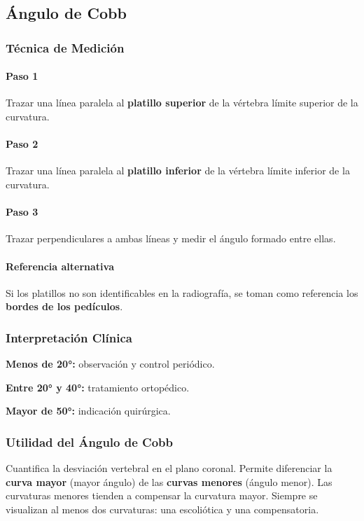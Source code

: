 	\twocolumn	
	\clearpage
	\subsection{Ángulo de Cobb}
	
	\subsubsection*{Técnica de Medición}
	
	\paragraph{Paso 1}
	Trazar una línea paralela al \textbf{platillo superior} de la vértebra límite superior de la curvatura.
	
	\paragraph{Paso 2}
	Trazar una línea paralela al \textbf{platillo inferior} de la vértebra límite inferior de la curvatura.
	
	\paragraph{Paso 3}
	Trazar perpendiculares a ambas líneas y medir el ángulo formado entre ellas.
	
	\paragraph{Referencia alternativa}
	Si los platillos no son identificables en la radiografía, se toman como referencia los \textbf{bordes de los pedículos}.
	
	\subsubsection*{Interpretación Clínica}
	
	\textbf{Menos de 20°:} observación y control periódico.
	
	\textbf{Entre 20° y 40°:} tratamiento ortopédico.
	
	\textbf{Mayor de 50°:} indicación quirúrgica.
	
	\subsubsection*{Utilidad del Ángulo de Cobb}
	Cuantifica la desviación vertebral en el plano coronal. Permite diferenciar la \textbf{curva mayor} (mayor ángulo) de las \textbf{curvas menores} (ángulo menor). Las curvaturas menores tienden a compensar la curvatura mayor. Siempre se visualizan al menos dos curvaturas: una escoliótica y una compensatoria.
	
